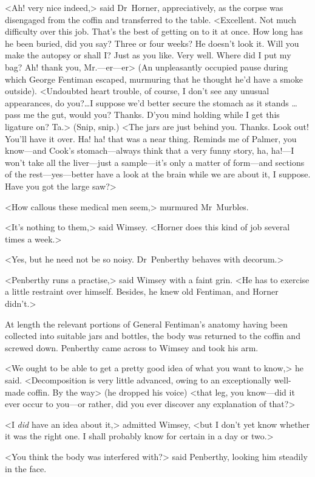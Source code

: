 <Ah! very nice indeed,> said Dr~Horner, appreciatively, as the corpse was disengaged from the coffin and transferred to the table. <Excellent. Not much difficulty over this job. That's the best of getting on to it at once. How long has he been buried, did you say? Three or four weeks? He doesn't look it. Will you make the autopsy or shall I\@? Just as you like. Very well. Where did I put my bag? Ah! thank you, Mr.—er—er\longdash> (An unpleasantly occupied pause during which George Fentiman escaped, murmuring that he thought he'd have a smoke outside). <Undoubted heart trouble, of course, I don't see any unusual appearances, do you?\dots I suppose we'd better secure the stomach as it stands \dots  pass me the gut, would you? Thanks. D'you mind holding while I get this ligature on? Ta.> (Snip, snip.) <The jars are just behind you. Thanks. Look out! You'll have it over. Ha! ha! that was a near thing. Reminds me of Palmer, you know—and Cook's stomach—always think that a very funny story, ha, ha!—I won't take all the liver—just a sample—it's only a matter of form—and sections of the rest—yes—better have a look at the brain while we are about it, I suppose. Have you got the large saw?>

<How callous these medical men seem,> murmured Mr~Murbles.

<It's nothing to them,> said Wimsey. <Horner does this kind of job several times a week.>

<Yes, but he need not be so noisy. Dr~Penberthy behaves with decorum.>

<Penberthy runs a practise,> said Wimsey with a faint grin. <He has to exercise a little restraint over himself. Besides, he knew old Fentiman, and Horner didn't.>

At length the relevant portions of General Fentiman's anatomy having been collected into suitable jars and bottles, the body was returned to the coffin and screwed down. Penberthy came across to Wimsey and took his arm.

<We ought to be able to get a pretty good idea of what you want to know,> he said. <Decomposition is very little advanced, owing to an exceptionally well-made coffin. By the way> (he dropped his voice) <that leg, you know—did it ever occur to you—or rather, did you ever discover any explanation of that?>

<I \emph{did} have an idea about it,> admitted Wimsey, <but I don't yet know whether it was the right one. I shall probably know for certain in a day or two.>

<You think the body was interfered with?> said Penberthy, looking him steadily in the face.

